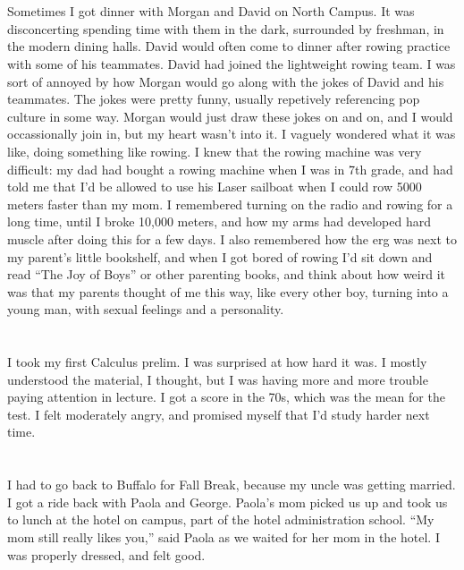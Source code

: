 \section{}

Sometimes I got dinner with Morgan and David on North Campus.  It was
disconcerting spending time with them in the dark, surrounded by freshman, in
the modern dining halls.  David would often come to dinner after rowing practice
with some of his teammates.  David had joined the lightweight rowing team.  I
was sort of annoyed by how Morgan would go along with the jokes of David and his
teammates.  The jokes were pretty funny, usually repetively referencing pop
culture in some way.  Morgan would just draw these jokes on and on, and I would
occassionally join in, but my heart wasn't into it.  I vaguely wondered what it
was like, doing something like rowing.  I knew that the rowing machine was very
difficult: my dad had bought a rowing machine when I was in 7th grade,
and had told me that I'd be allowed to use his Laser sailboat when I could row
5000 meters faster than my mom.  I remembered turning on the radio and rowing
for a long time, until I broke 10,000 meters, and how my arms had developed hard
muscle after doing this for a few days.  I also remembered how the erg was next
to my parent's little bookshelf, and when I got bored of rowing I'd sit down and
read ``The Joy of Boys'' or other parenting books, and think about how weird it
was that my parents thought of me this way, like every other boy, turning into a
young man, with sexual feelings and a personality.  

\section{}

I took my first Calculus prelim.  I was surprised at how hard it was.  I mostly
understood the material, I thought, but I was having more and more trouble
paying attention in lecture.  I got a score in the 70s, which was the mean for
the test.  I felt moderately angry, and promised myself that I'd study harder
next time.

\section{}

I had to go back to Buffalo for Fall Break, because my uncle was getting
married.  I got a ride back with Paola and George.  Paola's mom picked us up and
took us to lunch at the hotel on campus, part of the hotel administration
school.  ``My mom still really likes you,'' said Paola as we waited for her mom
in the hotel.  I was properly dressed, and felt good.  

